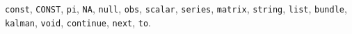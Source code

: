 \texttt{const}, \texttt{CONST}, \texttt{pi}, \texttt{NA}, \texttt{null}, \texttt{obs}, \texttt{scalar}, \texttt{series}, \texttt{matrix}, \texttt{string}, \texttt{list}, \texttt{bundle}, \texttt{kalman}, \texttt{void}, \texttt{continue}, \texttt{next}, \texttt{to}.

